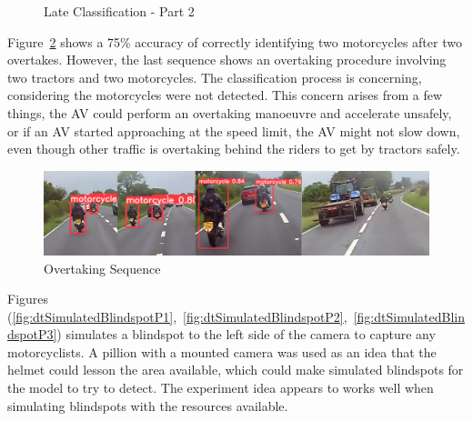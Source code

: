 \documentclass[12pt]{report} %
\begin{document}
\begin{figure}[ht]
\begin{floatrow}
				{
					\caption{Late Classification - Part 2}
					\label{fig:lateClassificationP2}
				}
			\end{floatrow}
		\end{figure}


		Figure~\ref{fig:overtakingSequence} shows a 75\% accuracy of correctly identifying two motorcycles after two overtakes. However, the last sequence shows an overtaking procedure involving two tractors and two motorcycles. The classification process is concerning, considering the motorcycles were not detected. This concern arises from a few things, the AV could perform an overtaking manoeuvre and accelerate unsafely, or if an AV started approaching at the speed limit, the AV might not slow down, even though other traffic is overtaking behind the riders to get by tractors safely.
		\begin{figure}[hb]
			\centering
			\includegraphics[width=\columnwidth]{Figures/scenarios/motorcycle_overtaking_sequence.png}
			\caption{Overtaking Sequence}
			\label{fig:overtakingSequence}
		\end{figure}

		\clearpage
		Figures (\ref{fig:dtSimulatedBlindspotP1},~\ref{fig:dtSimulatedBlindspotP2},~\ref{fig:dtSimulatedBlindspotP3}) simulates a blindspot to the left side of the camera to capture any motorcyclists. A pillion with a mounted camera was used as an idea that the helmet could lesson the area available, which could make simulated blindspots for the model to try to detect. The experiment idea appears to works well when simulating blindspots with the resources available.
		
\end{document}
